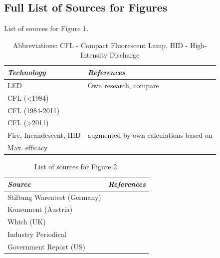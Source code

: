 \documentclass[parskip=full]{article}
\begin{document}
\begin{figure}[H]
\label{fig:phosphor_spectrum}
\end{figure}

\clearpage
\subsection{Full List of Sources for Figures}
\label{sec:sources}

\begin{table}[h!]
\captionsetup{justification=raggedright,singlelinecheck=false}
    \caption{List of sources for Figure 1.}
    \begin{NiceTabularX}{\textwidth}{|l|X|}
    \hline
    \textit{Technology} & \textit{References} \\
    \hline
    LED & Own research, compare \cite{zenodo_weinold_led_history} \\
    \hline
    CFL (<1984) & \cite{Bouwknegt1982}\cite{Vrenken1983} \\
    \hline
    CFL (1984-2011) & \cite{eger2018origin} \\
    \hline
    CFL (>2011) & \cite{Guan2015} \\
    \hline
    Fire, Incandescent, HID & \cite{azevedo2009transition} augmented by own calculations based on \cite{benesch1905beleuchtungswesen} \\
    \hline
    Max. efficacy & \cite{Murphy2012} \\
    \hline
    \end{NiceTabularX}
    \vspace{2mm}
    \caption*{Abbreviations: CFL - Compact Fluorescent Lamp, HID - High-Intensity Discharge}
\end{table}

\begin{table}[h!]
\captionsetup{justification=raggedright,singlelinecheck=false}
    \caption{List of sources for Figure 2.}
    \begin{NiceTabularX}{\textwidth}{|l|X|}
    \hline
    \textit{Source} & \textit{References} \\
    \hline
    Stiftung Warentest (Germany) & \cite{Warentest2008}\cite{Warentest2009_1}\cite{Warentest2009_2}\cite{Warentest2010_1}\cite{Warentest2010_2}\cite{Warentest2011}\cite{Warentest2012}\cite{Warentest2013}\cite{Warentest2014_1}\cite{Warentest2014_2}\cite{Warentest2015}\cite{Warentest2016_1}\cite{Warentest2016_2}\cite{Warentest2018} \\
    \hline
    Konsument (Austria) & \cite{Konsument2010} \\
    \hline
    Which (UK) & \cite{Which2020} \\
    \hline
    Industry Periodical & \cite{PM2020} \\
    \hline
    Government Report (US) & \cite{national2013assessment} \\
    \hline
    \end{NiceTabularX}
\end{table}
\end{document}
